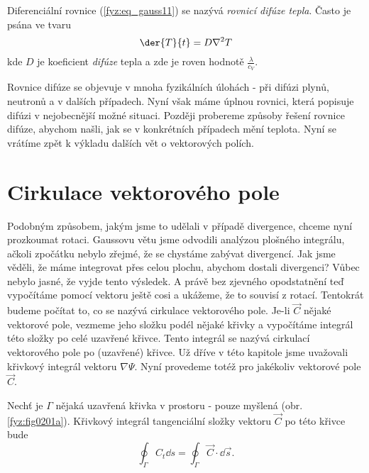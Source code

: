       Diferenciální rovnice (\ref{fyz:eq_gauss11}) se nazývá \emph{rovnicí difúze tepla}. Často je 
      psána ve tvaru
      \begin{equation}\label{fyz:eq_gauss12}
       \der{T}{t} = D\nabla^2T
      \end{equation}
      kde \(D\) je koeficient \emph{difúze} tepla a zde je roven hodnotě
      \(\displaystyle\frac{\lambda}{c_V}\).
      
      Rovnice difúze se objevuje v mnoha fyzikálních úlohách - při difúzi plynů, neutronů a v 
      dalších případech. Nyní však máme úplnou rovnici, která popisuje difúzi v nejobecnější možné 
      situaci. Později probereme způsoby řešení rovnice difúze, abychom našli, jak se v konkrétních 
      případech mění teplota. Nyní se vrátíme zpět k výkladu dalších vět o vektorových polích.

  \section{Cirkulace vektorového pole}\label{fyz:IIchapIIIsecIV}
    Podobným způsobem, jakým jsme to udělali v případě divergence, chceme nyní prozkoumat rotaci. 
    Gaussovu větu jsme odvodili analýzou plošného integrálu, ačkoli zpočátku nebylo zřejmé, že se 
    chystáme zabývat divergencí. Jak jsme věděli, že máme integrovat přes celou plochu, abychom 
    dostali divergenci? Vůbec nebylo jasné, že vyjde tento výsledek. A právě bez zjevného  
    opodstatnění teď vypočítáme pomocí vektoru ještě cosi a ukážeme, že to souvisí z rotací. 
    Tentokrát budeme počítat to, co se nazývá cirkulace vektorového pole. Je-li \(\vec{C}\) nějaké 
    vektorové pole, vezmeme jeho složku podél nějaké křivky a vypočítáme integrál této složky po 
    celé uzavřené křivce. Tento integrál se nazývá cirkulací vektorového pole po (uzavřené) křivce. 
    Už dříve v této kapitole jsme uvažovali křivkový integrál vektoru \(\nabla\Psi\). Nyní 
    provedeme totéž pro jakékoliv vektorové pole \(\vec{C}\).
    
    Nechť je \(\Gamma\) nějaká uzavřená křivka v prostoru - pouze myšlená (obr. \ref{fyz:fig0201a}). 
    Křivkový integrál tangenciální složky vektoru \(\vec{C}\) po této křivce bude
    \begin{equation}\label{fyz:eq_fey_circ1}
     \oint_\Gamma C_t\dd{s} = \oint_\Gamma\vec{C}\cdot\dd{\vec{s}}.
    \end{equation}    
    
